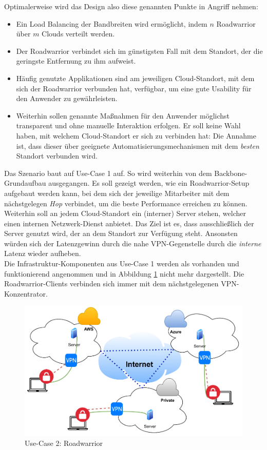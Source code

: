 Optimalerweise wird das Design also diese genannten Punkte in Angriff nehmen:
\begin{itemize}
\item Ein Load Balancing der Bandbreiten wird ermöglicht, indem $n$ Roadwarrior über $m$ Clouds verteilt werden.
\item Der Roadwarrior verbindet sich im günstigsten Fall mit dem Standort, der die geringste Entfernung zu ihm aufweist.
\item Häufig genutzte Applikationen sind am jeweiligen Cloud-Standort, mit dem sich der Roadwarrior verbunden hat, verfügbar, um eine gute Usability für den Anwender zu gewährleisten.
\item Weiterhin sollen genannte Maßnahmen für den Anwender möglichst transparent und ohne manuelle Interaktion erfolgen. Er soll keine Wahl haben, mit welchem Cloud-Standort er sich zu verbinden hat: Die Annahme ist, dass dieser über geeignete Automatisierungsmechanismen mit dem \textit{besten} Standort verbunden wird.
\end{itemize}
Das Szenario baut auf Use-Case 1 auf. So wird weiterhin von dem Backbone-Grundaufbau ausgegangen. Es soll gezeigt werden, wie ein Roadwarrior-Setup aufgebaut werden kann, bei dem sich der jeweilige Mitarbeiter mit dem nächstgelegen \textit{Hop} verbindet, um die beste Performance erreichen zu können. Weiterhin soll an jedem Cloud-Standort ein (interner) Server stehen, welcher einen internen Netzwerk-Dienst anbietet. Das Ziel ist es, dass ausschließlich der Server genutzt wird, der an dem Standort zur Verfügung steht. Ansonsten würden sich der Latenzgewinn durch die nahe VPN-Gegenstelle durch die \textit{interne} Latenz wieder aufheben.\\
Die Infrastruktur-Komponenten aus Use-Case 1 werden als vorhanden und funktionierend angenommen und in Abbildung \ref{grafik:Use-Case-2_Vereinfacht} nicht mehr dargestellt. Die Roadwarrior-Clients verbinden sich immer mit dem nächstgelegenen VPN-Konzentrator.
\begin{figure}[h]
  \centering
  \includegraphics[scale=0.75]{Figures/Use-Case_2_Vereinfacht_1.pdf}
  \caption{Use-Case 2: Roadwarrior}
  \label{grafik:Use-Case-2_Vereinfacht}
\end{figure}\FloatBarrier

